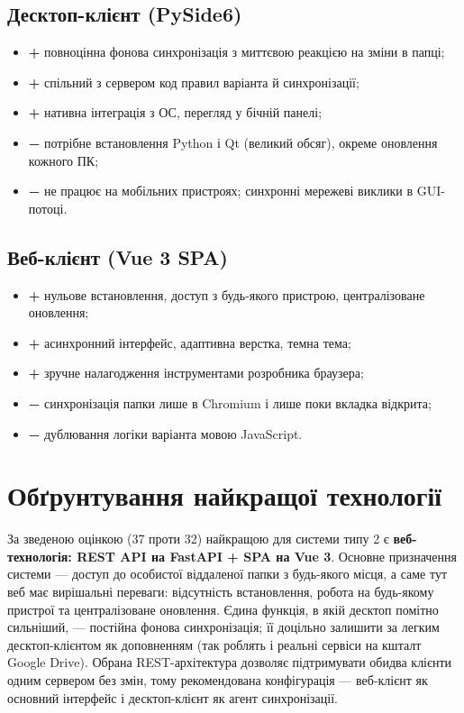\documentclass[12pt,a4paper]{article}
\begin{document}
\subsection{Десктоп-клієнт (PySide6)}

\begin{itemize}[nosep]
    \item \textbf{+} повноцінна фонова синхронізація з миттєвою реакцією на зміни в папці;
    \item \textbf{+} спільний з сервером код правил варіанта й синхронізації;
    \item \textbf{+} нативна інтеграція з ОС, перегляд у бічній панелі;
    \item \textbf{−} потрібне встановлення Python і Qt (великий обсяг), окреме оновлення кожного ПК;
    \item \textbf{−} не працює на мобільних пристроях; синхронні мережеві виклики в GUI-потоці.
\end{itemize}

\subsection{Веб-клієнт (Vue 3 SPA)}

\begin{itemize}[nosep]
    \item \textbf{+} нульове встановлення, доступ з будь-якого пристрою, централізоване оновлення;
    \item \textbf{+} асинхронний інтерфейс, адаптивна верстка, темна тема;
    \item \textbf{+} зручне налагодження інструментами розробника браузера;
    \item \textbf{−} синхронізація папки лише в Chromium і лише поки вкладка відкрита;
    \item \textbf{−} дублювання логіки варіанта мовою JavaScript.
\end{itemize}


\section{Обґрунтування найкращої технології}

За зведеною оцінкою (37 проти 32) найкращою для системи типу 2 є \textbf{веб-технологія: REST API на FastAPI + SPA на Vue 3}. Основне призначення системи --- доступ до особистої віддаленої папки з будь-якого місця, а саме тут веб має вирішальні переваги: відсутність встановлення, робота на будь-якому пристрої та централізоване оновлення. Єдина функція, в якій десктоп помітно сильніший, --- постійна фонова синхронізація; її доцільно залишити за легким десктоп-клієнтом як доповненням (так роблять і реальні сервіси на кшталт Google Drive). Обрана REST-архітектура дозволяє підтримувати обидва клієнти одним сервером без змін, тому рекомендована конфігурація --- веб-клієнт як основний інтерфейс і десктоп-клієнт як агент синхронізації.
\end{document}
